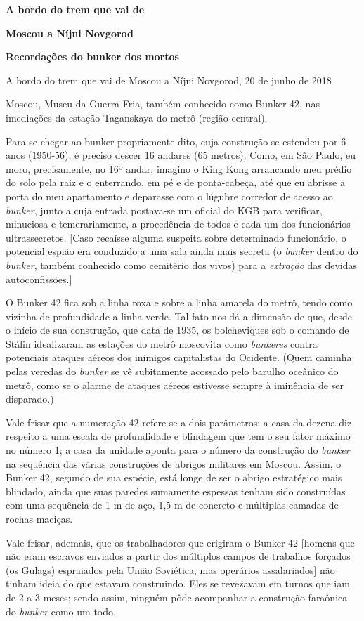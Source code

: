 \textbf{A bordo do trem que vai de }

\textbf{Moscou a Níjni Novgorod}

\textbf{Recordações do bunker dos mortos}

A bordo do trem que vai de Moscou a Níjni Novgorod, 20 de junho de 2018

Moscou, Museu da Guerra Fria, também conhecido como Bunker 42, nas
imediações da estação Taganskaya do metrô (região central).

Para se chegar ao bunker propriamente dito, cuja construção se estendeu
por 6 anos (1950-56), é preciso descer 16 andares (65 metros). Como, em
São Paulo, eu moro, precisamente, no 16º andar, imagino o King Kong
arrancando meu prédio do solo pela raiz e o enterrando, em pé e de
ponta-cabeça, até que eu abrisse a porta do meu apartamento e deparasse
com o lúgubre corredor de acesso ao \emph{bunker}, junto a cuja entrada
postava-se um oficial do KGB para verificar, minuciosa e temerariamente,
a procedência de todos e cada um dos funcionários ultrassecretos.
{[}Caso recaísse alguma suspeita sobre determinado funcionário, o
potencial espião era conduzido a uma sala ainda mais secreta (o
\emph{bunker} dentro do \emph{bunker}, também conhecido como cemitério
dos vivos) para a \emph{extração} das devidas autoconfissões.{]}

O Bunker 42 fica sob a linha roxa e sobre a linha amarela do metrô,
tendo como vizinha de profundidade a linha verde. Tal fato nos dá a
dimensão de que, desde o início de sua construção, que data de 1935, os
bolcheviques sob o comando de Stálin idealizaram as estações do metrô
moscovita como \emph{bunkeres} contra potenciais ataques aéreos dos
inimigos capitalistas do Ocidente. (Quem caminha pelas veredas do
\emph{bunker} se vê subitamente acossado pelo barulho oceânico do metrô,
como se o alarme de ataques aéreos estivesse sempre à iminência de ser
disparado.)

Vale frisar que a numeração 42 refere-se a dois parâmetros: a casa da
dezena diz respeito a uma escala de profundidade e blindagem que tem o
seu fator máximo no número 1; a casa da unidade aponta para o número da
construção do \emph{bunker} na sequência das várias construções de
abrigos militares em Moscou. Assim, o Bunker 42, segundo de sua espécie,
está longe de ser o abrigo estratégico mais blindado, ainda que suas
paredes sumamente espessas tenham sido construídas com uma sequência de
1 m de aço, 1,5 m de concreto e múltiplas camadas de rochas maciças.

Vale frisar, ademais, que os trabalhadores que erigiram o Bunker 42
{[}homens que não eram escravos enviados a partir dos múltiplos campos
de trabalhos forçados (os Gulags) espraiados pela União Soviética, mas
operários assalariados{]} não tinham ideia do que estavam construindo.
Eles se revezavam em turnos que iam de 2 a 3 meses; sendo assim, ninguém
pôde acompanhar a construção faraônica do \emph{bunker} como um todo.

